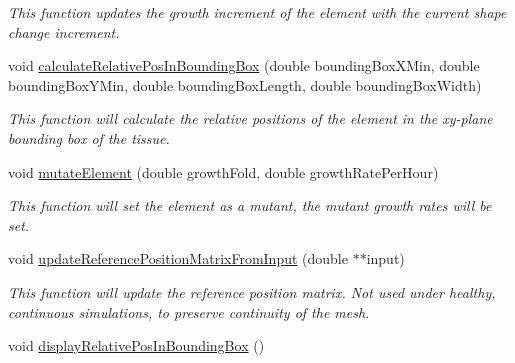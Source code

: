 \begin{DoxyCompactItemize}
\begin{DoxyCompactList}\small\item\em This function updates the growth increment of the element with the current shape change increment. \end{DoxyCompactList}\item 
\hypertarget{classShapeBase_a04278729ad9cc3238b1966ade0685a3d}{}void \hyperlink{classShapeBase_a04278729ad9cc3238b1966ade0685a3d}{calculate\+Relative\+Pos\+In\+Bounding\+Box} (double bounding\+Box\+X\+Min, double bounding\+Box\+Y\+Min, double bounding\+Box\+Length, double bounding\+Box\+Width)\label{classShapeBase_a04278729ad9cc3238b1966ade0685a3d}

\begin{DoxyCompactList}\small\item\em This function will calculate the relative positions of the element in the xy-\/plane bounding box of the tissue. \end{DoxyCompactList}\item 
\hypertarget{classShapeBase_af39a584fa424f92b219d0ad903439ae7}{}void \hyperlink{classShapeBase_af39a584fa424f92b219d0ad903439ae7}{mutate\+Element} (double growth\+Fold, double growth\+Rate\+Per\+Hour)\label{classShapeBase_af39a584fa424f92b219d0ad903439ae7}

\begin{DoxyCompactList}\small\item\em This function will set the element as a mutant, the mutant growth rates will be set. \end{DoxyCompactList}\item 
\hypertarget{classShapeBase_acf601cf9b007a1e001b01fb5ed84399a}{}void \hyperlink{classShapeBase_acf601cf9b007a1e001b01fb5ed84399a}{update\+Reference\+Position\+Matrix\+From\+Input} (double $\ast$$\ast$input)\label{classShapeBase_acf601cf9b007a1e001b01fb5ed84399a}

\begin{DoxyCompactList}\small\item\em This function will update the reference position matrix. Not used under healthy, continuous simulations, to preserve continuity of the mesh. \end{DoxyCompactList}\item 
\hypertarget{classShapeBase_ae5e17514271f121498ed12cebae3aebe}{}void \hyperlink{classShapeBase_ae5e17514271f121498ed12cebae3aebe}{display\+Relative\+Pos\+In\+Bounding\+Box} ()\label{classShapeBase_ae5e17514271f121498ed12cebae3aebe}


\end{DoxyCompactItemize}
